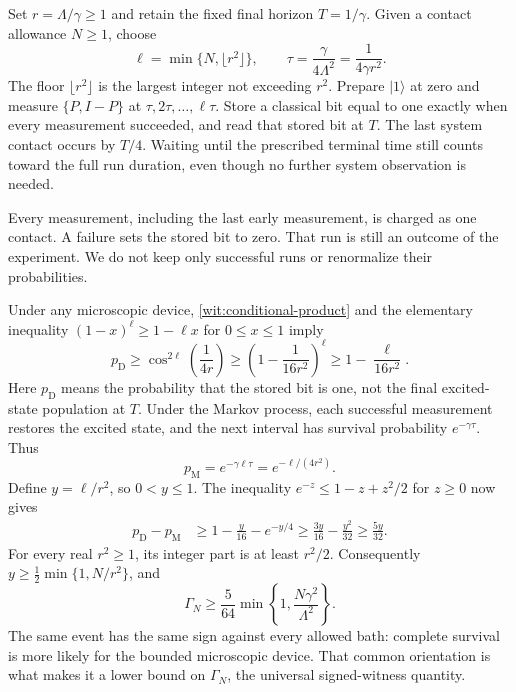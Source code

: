\documentclass[11pt,a4paper]{article}
\numberwithin{equation}{section}
\theoremstyle{remark}
\begin{document}
Set $r=\Lambda/\gamma\geq1$ and retain the fixed final horizon
$T=1/\gamma$. Given a contact allowance $N\geq1$, choose
\begin{equation}
 \ell=\min\{N,\lfloor r^2\rfloor\},\qquad
 \tau=\frac{\gamma}{4\Lambda^2}
      =\frac{1}{4\gamma r^2}.
 \label{wit:qubit-schedule}
\end{equation}
The floor $\lfloor r^2\rfloor$ is the largest integer not exceeding
$r^2$. Prepare $|1\rangle$ at zero and measure $\{P,I-P\}$ at
$\tau,2\tau,\ldots,\ell\tau$. Store a classical bit equal to one exactly
when every measurement succeeded, and read that stored bit at $T$.
The last system contact occurs by $T/4$. Waiting until the prescribed
terminal time still counts toward the full run duration, even though no
further system observation is needed.

Every measurement, including the last early measurement, is charged as
one contact. A failure sets the stored bit to zero. That run is still an
outcome of the experiment. We do not keep only successful runs or
renormalize their probabilities.

Under any microscopic device, \eqref{wit:conditional-product} and the
elementary inequality $(1-x)^\ell\geq1-\ell x$ for $0\leq x\leq1$ imply
\begin{equation}
 p_{\mathrm D}
 \geq\cos^{2\ell}\!\left(\frac1{4r}\right)
 \geq\left(1-\frac1{16r^2}\right)^\ell
 \geq1-\frac{\ell}{16r^2}.
 \label{wit:qubit-micro}
\end{equation}
Here $p_{\mathrm D}$ means the probability that the stored bit is one,
not the final excited-state population at $T$.
Under the Markov process, each successful measurement restores the
excited state, and the next interval has survival probability
$e^{-\gamma\tau}$. Thus
\begin{equation}
 p_{\mathrm M}=e^{-\gamma \ell\tau}=e^{-\ell/(4r^2)}.
 \label{wit:qubit-markov}
\end{equation}
Define $y=\ell/r^2$, so $0<y\leq1$. The inequality
$e^{-z}\leq1-z+z^2/2$ for $z\geq0$ now gives
\begin{align}
 p_{\mathrm D}-p_{\mathrm M}
 &\geq1-\frac y{16}-e^{-y/4}
 \geq\frac{3y}{16}-\frac{y^2}{32}
 \geq\frac{5y}{32}. \label{wit:qubit-gap}
\end{align}
For every real $r^2\geq1$, its integer part is at least $r^2/2$.
Consequently $y\geq\tfrac12\min\{1,N/r^2\}$, and
\begin{equation}
 \Gamma_N\geq\frac5{64}\min\!\left\{1,\frac{N\gamma^2}{\Lambda^2}\right\}.
 \label{wit:qubit-lower}
\end{equation}
The same event has the same sign against every allowed bath: complete
survival is more likely for the bounded microscopic device. That common
orientation is what makes it a lower bound on $\Gamma_N$, the universal
signed-witness quantity.
\end{document}
